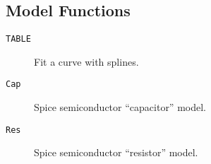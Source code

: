 \subsection*{Model Functions}

\begin{description}

\item[{\tt TABLE}] Fit a curve with splines.
\item[{\tt Cap}] Spice semiconductor ``capacitor'' model.
\item[{\tt Res}] Spice semiconductor ``resistor'' model.

\end{description}
